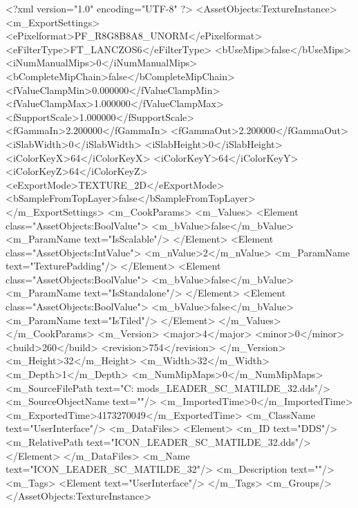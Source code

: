 <?xml version="1.0" encoding="UTF-8" ?>
<AssetObjects:TextureInstance>
	<m_ExportSettings>
		<ePixelformat>PF_R8G8B8A8_UNORM</ePixelformat>
		<eFilterType>FT_LANCZOS6</eFilterType>
		<bUseMips>false</bUseMips>
		<iNumManualMips>0</iNumManualMips>
		<bCompleteMipChain>false</bCompleteMipChain>
		<fValueClampMin>0.000000</fValueClampMin>
		<fValueClampMax>1.000000</fValueClampMax>
		<fSupportScale>1.000000</fSupportScale>
		<fGammaIn>2.200000</fGammaIn>
		<fGammaOut>2.200000</fGammaOut>
		<iSlabWidth>0</iSlabWidth>
		<iSlabHeight>0</iSlabHeight>
		<iColorKeyX>64</iColorKeyX>
		<iColorKeyY>64</iColorKeyY>
		<iColorKeyZ>64</iColorKeyZ>
		<eExportMode>TEXTURE_2D</eExportMode>
		<bSampleFromTopLayer>false</bSampleFromTopLayer>
	</m_ExportSettings>
	<m_CookParams>
		<m_Values>
			<Element class="AssetObjects:BoolValue">
				<m_bValue>false</m_bValue>
				<m_ParamName text="IsScalable"/>
			</Element>
			<Element class="AssetObjects:IntValue">
				<m_nValue>2</m_nValue>
				<m_ParamName text="TexturePadding"/>
			</Element>
			<Element class="AssetObjects:BoolValue">
				<m_bValue>false</m_bValue>
				<m_ParamName text="IsStandalone"/>
			</Element>
			<Element class="AssetObjects:BoolValue">
				<m_bValue>false</m_bValue>
				<m_ParamName text="IsTiled"/>
			</Element>
		</m_Values>
	</m_CookParams>
	<m_Version>
		<major>4</major>
		<minor>0</minor>
		<build>260</build>
		<revision>754</revision>
	</m_Version>
	<m_Height>32</m_Height>
	<m_Width>32</m_Width>
	<m_Depth>1</m_Depth>
	<m_NumMipMaps>0</m_NumMipMaps>
	<m_SourceFilePath text="C:\Users\Chris\Desktop{} mods\Matilde\ICON_LEADER_SC_MATILDE_32.dds"/>
	<m_SourceObjectName text=""/>
	<m_ImportedTime>0</m_ImportedTime>
	<m_ExportedTime>4173270049</m_ExportedTime>
	<m_ClassName text="UserInterface"/>
	<m_DataFiles>
		<Element>
			<m_ID text="DDS"/>
			<m_RelativePath text="ICON_LEADER_SC_MATILDE_32.dds"/>
		</Element>
	</m_DataFiles>
	<m_Name text="ICON_LEADER_SC_MATILDE_32"/>
	<m_Description text=""/>
	<m_Tags>
		<Element text="UserInterface"/>
	</m_Tags>
	<m_Groups/>
</AssetObjects:TextureInstance>

 